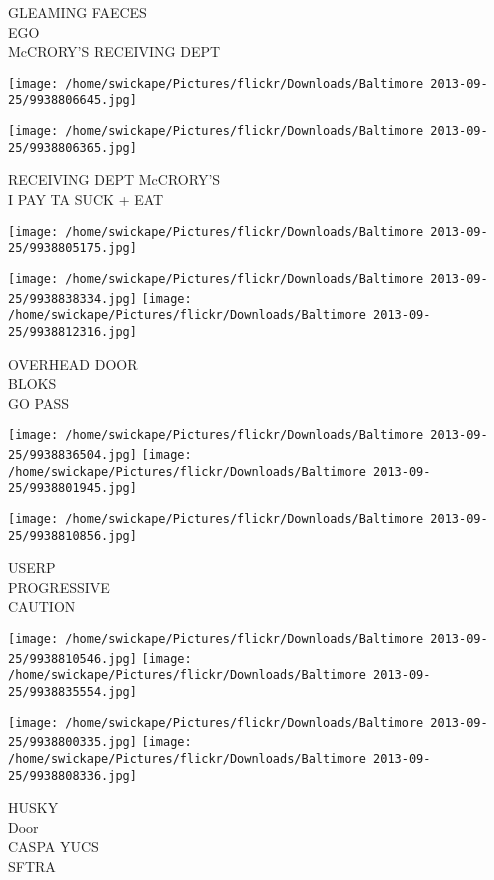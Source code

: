 \documentclass[10pt,letterpaper]{article}
\begin{document}
GLEAMING FAECES\\
EGO\\
McCRORY'S RECEIVING DEPT
\pagebreak

\texttt{[image: /home/swickape/Pictures/flickr/Downloads/Baltimore 2013-09-25/9938806645.jpg]}

\vspace{0.25in}
\texttt{[image: /home/swickape/Pictures/flickr/Downloads/Baltimore 2013-09-25/9938806365.jpg]}

RECEIVING DEPT McCRORY'S\\
I PAY TA SUCK + EAT
\pagebreak

\texttt{[image: /home/swickape/Pictures/flickr/Downloads/Baltimore 2013-09-25/9938805175.jpg]}

\vspace{0.25in}
\texttt{[image: /home/swickape/Pictures/flickr/Downloads/Baltimore 2013-09-25/9938838334.jpg]}
\texttt{[image: /home/swickape/Pictures/flickr/Downloads/Baltimore 2013-09-25/9938812316.jpg]}

OVERHEAD DOOR\\
BLOKS\\
GO PASS
\pagebreak

\texttt{[image: /home/swickape/Pictures/flickr/Downloads/Baltimore 2013-09-25/9938836504.jpg]}
\texttt{[image: /home/swickape/Pictures/flickr/Downloads/Baltimore 2013-09-25/9938801945.jpg]}

\vspace{0.25in}
\texttt{[image: /home/swickape/Pictures/flickr/Downloads/Baltimore 2013-09-25/9938810856.jpg]}

USERP\\
PROGRESSIVE\\
CAUTION
\pagebreak

\texttt{[image: /home/swickape/Pictures/flickr/Downloads/Baltimore 2013-09-25/9938810546.jpg]}
\texttt{[image: /home/swickape/Pictures/flickr/Downloads/Baltimore 2013-09-25/9938835554.jpg]}

\texttt{[image: /home/swickape/Pictures/flickr/Downloads/Baltimore 2013-09-25/9938800335.jpg]}
\texttt{[image: /home/swickape/Pictures/flickr/Downloads/Baltimore 2013-09-25/9938808336.jpg]}

HUSKY\\
Door\\
CASPA YUCS\\
SFTRA
\pagebreak
\end{document}
